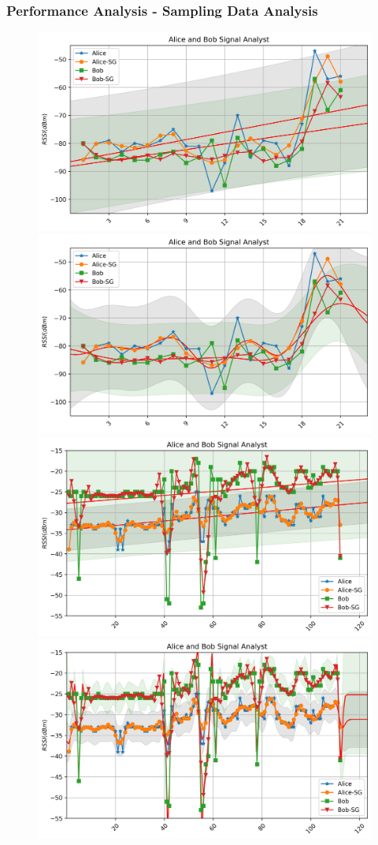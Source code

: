 \documentclass{beamer}
\begin{document}
\begin{frame}
  \frametitle{Performance Analysis - Sampling Data Analysis}

  \begin{figure}
    \centering
    {\includegraphics[width=0.421\linewidth]{../figures/conghuaanalystlr.png}}
    {\includegraphics[width=0.421\linewidth]{../figures/conghuaanalystrbf.png}}
    {\includegraphics[width=0.421\linewidth]{../figures/neartestanalystlr.png}}
    {\includegraphics[width=0.421\linewidth]{../figures/neartestanalystrbf.png}}
    \label{Sampling Data Analysis}
  \end{figure}
\end{frame}
\end{document}
